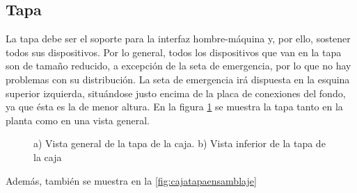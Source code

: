 \subsection{Tapa}

La tapa debe ser el soporte para la interfaz hombre-máquina y, por ello, sostener todos sus 
dispositivos. Por lo general, todos los dispositivos que van en la tapa son de tamaño reducido,
a excepción de la seta de emergencia, por lo que no hay problemas con su distribución. La seta
de emergencia irá dispuesta en la esquina superior izquierda, situándose justo encima de la placa
de conexiones del fondo, ya que ésta es la de menor altura. En la figura \ref{fig:cajatapa} se 
muestra la tapa tanto en la planta como en una vista general.

\begin{figure}[h]%
    \centering 
    \hspace{10pt}%
    \caption{a) Vista general de la tapa de la caja. b) Vista inferior de la tapa de la caja}
    \label{fig:cajatapa} 
\end{figure} 

Además, también se muestra en la \ref{fig:cajatapaensamblaje}

